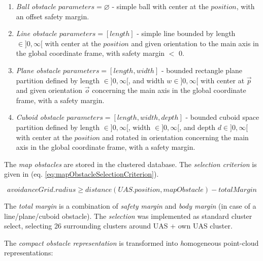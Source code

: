 \begin{enumerate}
    \item\emph{Ball obstacle $parameters=\varnothing$} - simple ball with center at the $position$, with an offset safety margin.
    
    \item\emph{Line obstacle $parameters=[length]$} - simple line bounded by length $\in]0,\infty[$ with center at the $position$ and given orientation to the main axis in the global coordinate frame, with safety margin $<$ 0.
    
    \item\emph{Plane obstacle $parameters=[length,width]$} - bounded rectangle plane partition defined by length $\in]0,\infty[$, and width $w\in]0,\infty[$ with center at $\vec{p}$ and given orientation $\vec{o}$ concerning the main axis in the global coordinate frame, with a safety margin.
    
    \item\emph{Cuboid obstacle $parameters=[length,width,depth]$} - bounded cuboid space partition defined by length $\in]0,\infty[$, width $\in]0,\infty[$, and depth $d\in]0,\infty[$ with center at the $position$ and rotated in orientation concerning the main axis in the global coordinate frame, with a safety margin.
\end{enumerate}

\noindent The \emph{map obstacles} are stored in the clustered database. The \emph{selection criterion} is given in (eq. \ref{eq:mapObstacleSelectionCriterion}).

\begin{equation}\label{eq:mapObstacleSelectionCriterion}
    avoidance Grid.radius \ge distance(UAS.position,map Obstacle) - total Margin
\end{equation}

\noindent The \emph{total margin} is a combination of \emph{safety margin} and \emph{body margin} (in case of a line/plane/cuboid obstacle). The \emph{selection} was implemented as standard cluster select, selecting 26  surrounding clusters around UAS + own UAS cluster.

\noindent The \emph{compact obstacle representation} is transformed into \emph homogeneous point-cloud representations:


